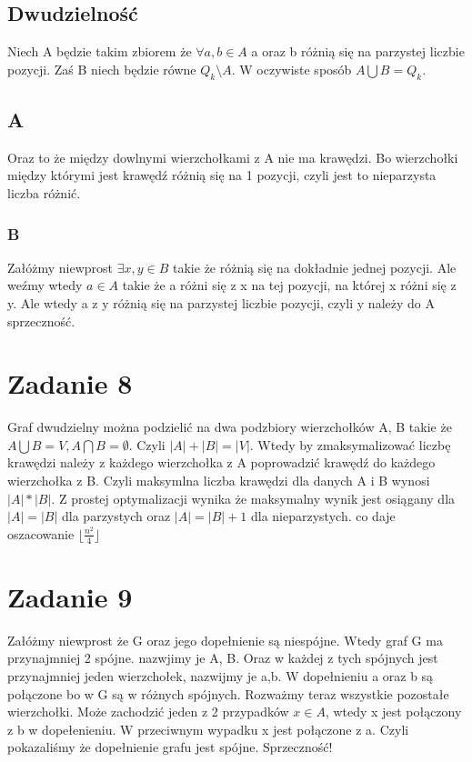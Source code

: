 \documentclass{article}
\begin{document}
\subsection*{Dwudzielność}
Niech A będzie takim zbiorem że $\forall a,b \in A$ a oraz b różnią się na parzystej liczbie pozycji. Zaś B niech będzie równe $Q_k \setminus A$. W oczywiste sposób $A \bigcup B = Q_k$.
\subsection*{A}
Oraz to że między dowlnymi wierzchołkami z A nie ma krawędzi. Bo wierzchołki między którymi jest krawędź różnią się na 1 pozycji, czyli jest to nieparzysta liczba różnić.
\subsubsection*{B}
Załóżmy niewprost $\exists x,y \in B$ takie że różnią się na dokładnie jednej pozycji. Ale weźmy wtedy $a \in A$ takie że a różni się z x na tej pozycji, na której x różni się z y. Ale wtedy a z y różnią się na parzystej liczbie pozycji, czyli y należy do A sprzeczność.

\section*{Zadanie 8}
Graf dwudzielny można podzielić na dwa podzbiory wierzchołków A, B takie że $A \bigcup B = V, A \bigcap B = \emptyset$. Czyli $|A| + |B| = |V|$. Wtedy by zmaksymalizować liczbę krawędzi należy z każdego wierzchołka z A poprowadzić krawędź do każdego wierzchołka z B. Czyli maksymlna liczba krawędzi dla danych A i B wynosi $|A| * |B|$. Z prostej optymalizacji wynika że maksymalny wynik jest osiągany dla $|A| = |B|$ dla parzystych oraz $|A| = |B| + 1$ dla nieparzystych. co daje oszacowanie $\lfloor \frac{n^2}{4} \rfloor$


\section*{Zadanie 9}
Załóżmy niewprost że G oraz jego dopełnienie są niespójne.
Wtedy graf G ma przynajmniej 2 spójne. nazwjimy je A, B. Oraz w każdej z tych spójnych jest przynajmniej jeden wierzchołek, nazwijmy je a,b. W dopełnieniu a oraz b są połączone bo w G są w różnych spójnych. Rozważmy teraz wszystkie pozostałe wierzchołki. Może zachodzić jeden z 2 przypadków $x \in A$, wtedy x jest połączony z b w dopełenieniu. W przeciwnym wypadku x jest połączone z a. Czyli pokazaliśmy że dopełnienie grafu jest spójne. Sprzeczność!
\end{document}
